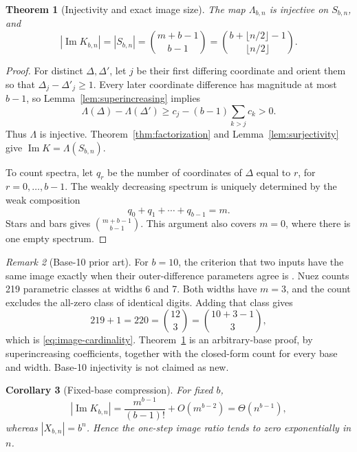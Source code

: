 \documentclass[11pt]{article}
\newtheorem{theorem}{Theorem}[section]
\newtheorem{corollary}[theorem]{Corollary}
\theoremstyle{definition}
\theoremstyle{remark}
\newtheorem{remark}[theorem]{Remark}
\newcommand{\1}{\mathbf{1}}
\DeclareMathOperator{\ImMap}{Im}
\begin{document}
\begin{theorem}[Injectivity and exact image size]\label{thm:image}
The map $\Lambda_{b,n}$ is injective on $S_{b,n}$, and
\begin{equation}\label{eq:image-cardinality}
  \left|\ImMap K_{b,n}\right|
  =|S_{b,n}|
  =\binom{m+b-1}{b-1}
  =\binom{b+\lfloor n/2\rfloor-1}{\lfloor n/2\rfloor}.
\end{equation}
\end{theorem}

\begin{proof}
For distinct $\Delta,\Delta'$, let $j$ be their first differing coordinate and
orient them so that $\Delta_j-\Delta'_j\geq1$.  Every later coordinate
difference has magnitude at most $b-1$, so Lemma~\ref{lem:superincreasing}
implies
\[
 \Lambda(\Delta)-\Lambda(\Delta')
 \geq c_j-(b-1)\sum_{k>j}c_k>0.
\]
Thus $\Lambda$ is injective.  Theorem~\ref{thm:factorization} and
Lemma~\ref{lem:surjectivity} give
$\ImMap K=\Lambda(S_{b,n})$.

To count spectra, let $q_r$ be the number of coordinates of $\Delta$ equal to
$r$, for $r=0,\ldots,b-1$.  The weakly decreasing spectrum is uniquely
determined by the weak composition
\[
 q_0+q_1+\cdots+q_{b-1}=m.
\]
Stars and bars gives $\binom{m+b-1}{b-1}$.  This argument also covers $m=0$,
where there is one empty spectrum.
\end{proof}

\begin{remark}[Base-10 prior art]\label{rem:nuez}
For $b=10$, the criterion that two inputs have the same image exactly when
their outer-difference parameters agree is \cite[eq.~(14)]{nuez2022}.  Nuez
counts 219 parametric classes at widths 6 and 7.  Both widths have $m=3$, and
the count excludes the all-zero class of identical digits.  Adding that class
gives
\[
  219+1=220=\binom{12}{3}=\binom{10+3-1}{3},
\]
which is \eqref{eq:image-cardinality}.  Theorem~\ref{thm:image} is an
arbitrary-base proof, by superincreasing coefficients, together with the
closed-form count for every base and width.  Base-10 injectivity is not
claimed as new.
\end{remark}

\begin{corollary}[Fixed-base compression]\label{cor:compression}
For fixed $b$,
\[
 |\ImMap K_{b,n}|
 =\frac{m^{b-1}}{(b-1)!}+O(m^{b-2})
 =\Theta(n^{b-1}),
\]
whereas $|X_{b,n}|=b^n$.  Hence the one-step image ratio tends to zero
exponentially in $n$.
\end{corollary}
\end{document}
